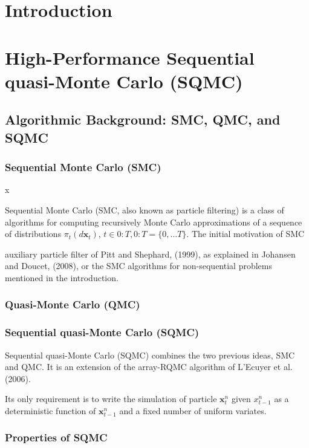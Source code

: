 \chapter{Introduction}

\chapter{High-Performance Sequential quasi-Monte Carlo (SQMC)}

\section{Algorithmic Background: SMC, QMC, and SQMC}

\subsection{Sequential Monte Carlo (SMC)}x

Sequential Monte Carlo (SMC, also known as particle filtering) is a class of algorithms for computing recursively Monte Carlo approximations of a sequence of distributions $\pi_t (d \mathbf{x}_t)$, $t \in 0:T, 0:T = \{0, \ldots T\}$. The initial motivation of SMC


auxiliary particle filter of Pitt and Shephard, (1999), as explained in Johansen and Doucet, (2008), or the SMC algorithms for non-sequential problems mentioned in the introduction.

\subsection{Quasi-Monte Carlo (QMC)}

\subsection{Sequential quasi-Monte Carlo (SQMC)}


Sequential quasi-Monte Carlo (SQMC) combines the two previous ideas, SMC and QMC. It is an extension of the array-RQMC algorithm of L'Ecuyer et al. (2006).

Its only requirement is to write the simulation of particle $\mathbf{x}_t^n$ given $x_{t-1}^n$ as a deterministic function of $\mathbf{x}_{t-1}^n$ and a fixed number of uniform variates.

\subsection{Properties of SQMC}

